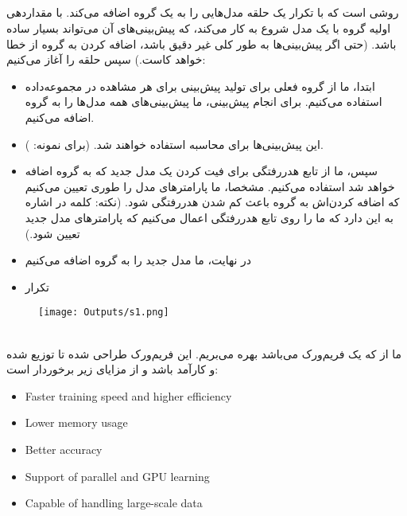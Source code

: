\documentclass{article}
\begin{document}
\subsection*{}
 روشی است که با تکرار یک حلقه مدل‌هایی را به یک گروه اضافه می‌کند. با مقداردهی اولیه گروه با یک مدل شروع به کار می‌کند، که پیش‌بینی‌های آن می‌تواند بسیار ساده باشد. (حتی اگر پیش‌بینی‌ها به طور کلی غیر دقیق باشد، اضافه کردن به گروه از خطا خواهد کاست.)
 سپس حلقه را آغاز می‌کنیم:
\begin{itemize}
\item
ابتدا، ما از گروه فعلی برای تولید پیش‌بینی برای هر مشاهده در مجموعه‌داده استفاده می‌کنیم. برای انجام پیش‌بینی، ما پیش‌بینی‌های همه مدل‌‌ها را به گروه اضافه می‌کنیم.
\item
این پیش‌بینی‌ها برای محاسبه  استفاده خواهند شد. (برای نمونه: ).
\item
سپس، ما از تابع هدررفتگی برای فیت کردن یک مدل جدید که به گروه اضافه خواهد شد استفاده می‌کنیم. مشخصا، ما پارامترهای مدل را طوری تعیین می‌کنیم که اضافه کردن‌اش به گروه باعث کم شدن هدررفتگی شود. (نکته: کلمه  در  اشاره به این دارد که ما  را روی تابع هدررفتگی اعمال می‌کنیم که پارامترهای مدل جدید تعیین شود.)
\item
در نهایت، ما مدل جدید را به گروه اضافه می‌کنیم
\item
تکرار
\end{itemize}
\begin{figure}[hbt!]
	\centering
	\texttt{[image: Outputs/s1.png]}
\end{figure}
\ \\
ما از  که یک فریم‌ورک  می‌باشد بهره می‌بریم. این فریم‌ورک طراحی شده تا توزیع شده و کارآمد باشد و از مزایای زیر برخوردار است:
\begin{flushleft}
\begin{latin}
\begin{itemize}
\item
Faster training speed and higher efficiency
\item
Lower memory usage
\item 
Better accuracy
\item
Support of parallel and GPU learning
\item
Capable of handling large-scale data
\end{itemize}
\end{latin}
\end{flushleft}
\end{document}
